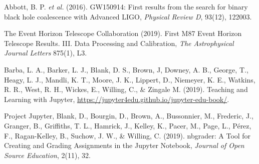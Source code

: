 \documentclass[twocolumn]{svjour3}          %
\begin{document}

\begin{thebibliography}{99}
%
%
Abbott, B. P. \textit{et al.} (2016).
GW150914: First results from the search for binary black hole coalescence with Advanced LIGO,
\textit{Physical Review D}, 93(12), 122003.

The Event Horizon Telescope Collaboration (2019).
First M87 Event Horizon Telescope Results. III. Data Processing and Calibration,
\textit{The Astrophysical Journal Letters} 875(1), L3.

Barba, L. A., Barker, L. J., Blank, D. S., Brown, J, Downey, A. B., George, T.,
Heagy, L. J., Mandli, K. T., Moore, J. K., Lippert, D., Niemeyer, K. E.,
Watkins, R. R., West, R. H., Wickes, E., Willing, C., \& Zingale M. (2019).
Teaching and Learning with Jupyter,
\url{https://jupyter4edu.github.io/jupyter-edu-book/}.

Project Jupyter, Blank, D., Bourgin, D., Brown, A., Bussonnier, M.,
Frederic, J., Granger, B., Griffiths, T. L.,  Hamrick, J., Kelley, K.,
Pacer, M., Page, L., P{\'e}rez, F., Ragan-Kelley, B., Suchow, J. W.,
\& Willing, C. (2019).
nbgrader: A Tool for Creating and Grading Assignments in the Jupyter Notebook,
\textit{Journal of Open Source Education}, 2(11), 32.
\end{thebibliography}
\end{document}
